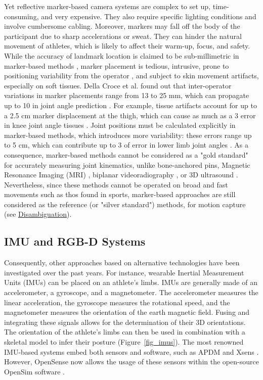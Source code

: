 Yet reflective marker-based camera systems are complex to set up, time-consuming, and very expensive. They also require specific lighting conditions and involve cumbersome cabling. Moreover, markers may fall off the body of the participant due to sharp accelerations or sweat. They can hinder the natural movement of athletes, which is likely to affect their warm-up, focus, and safety. While the accuracy of landmark location is claimed to be sub-millimetric in marker-based methods \cite{Topley2020}, marker placement is tedious, intrusive, prone to positioning variability from the operator \cite{Tsushima2003}, and subject to skin movement artifacts, especially on soft tissues. Della Croce et al. found out that inter-operator variations in marker placements range from 13 to 25 mm, which can propagate up to 10\degree{} in joint angle prediction \cite{Gorton2009,Croce1999}. For example, tissue artifacts account for up to a 2.5 cm marker displacement at the thigh, which can cause as much as a 3\degree{} error in knee joint angle tissues \cite{Benoit2015,Cappozzo1995}. Joint positions must be calculated explicitly in marker-based methods, which introduces more variability: these errors range up to 5 cm, which can contribute up to 3\degree{} of error in lower limb joint angles \cite{Leboeuf2019a}. As a consequence, marker-based methods cannot be considered as a "gold standard" for accurately measuring joint kinematics, unlike bone-anchored pins, Magnetic Resonance Imaging (MRI) \cite{Yahia2004}, biplanar videoradiography \cite{Miranda2013, Kessler2019}, or 3D ultrasound \cite{Peters2010}. Nevertheless, since these methods cannot be operated on broad and fast movements such as thos found in sports, marker-based approaches are still considered as the reference (or "silver standard") methods, for motion capture (see \hyperlink{Ann:gloss}{Disambiguation}).


\FloatBarrier
\subsection{IMU and RGB-D Systems}

Consequently, other approaches based on alternative technologies have been investigated over the past years. For instance, wearable Inertial Measurement Units (IMUs) can be placed on an athlete's limbs. IMUs are generally made of an accelerometer, a gyroscope, and a magnetometer. The accelerometer measures the linear acceleration, the gyroscope measures the rotational speed, and the magnetometer measures the orientation of the earth magnetic field. Fusing and integrating these signals allows for the determination of their 3D orientations. The orientation of the athlete's limbs can then be used in combination with a skeletal model to infer their posture (Figure~\ref{fig_imus}). The most renowned IMU-based systems embed both sensors and software, such as APDM \cite{APDM} and Xsens \cite{Xsens}. However, OpenSense now allows the usage of these sensors within the open-source OpenSim software \cite{Borno2022}.

